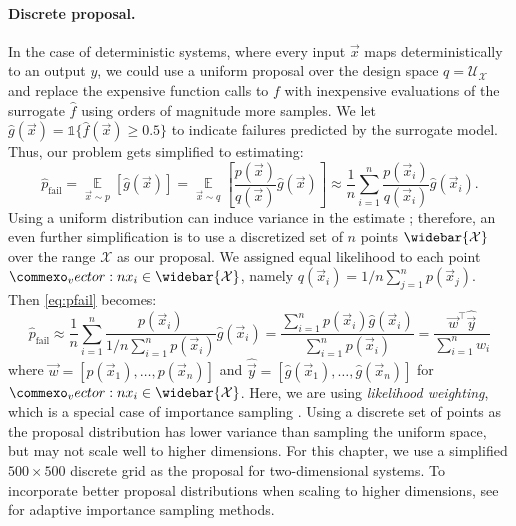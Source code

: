 \paragraph{Discrete proposal.}
In the case of deterministic systems, where every input $\vec{x}$ maps deterministically to an output $y$, we could use a uniform proposal over the design space $q = \mathcal{U}_\mathcal{X}$ and replace the expensive function calls to $f$ with inexpensive evaluations of the surrogate $\hat{f}$ using orders of magnitude more samples.
We let $\hat{g}(\vec{x}) = \mathds{1}\{\hat{f}(\vec{x}) \ge 0.5\}$ to indicate failures predicted by the surrogate model.
Thus, our problem gets simplified to estimating:
\begin{equation}
    \hat{p}_\text{fail} = \operatorname*{\mathbb{E}}_{\vec{x} \sim p}[\hat{g}(\vec{x})] = \operatorname*{\mathbb{E}}_{\vec{x} \sim q}\left[\frac{p(\vec{x})}{q(\vec{x})}\hat{g}(\vec{x})\right] \approx \frac{1}{n} \sum_{i=1}^n \frac{p(\vec{x}_i)}{q(\vec{x}_i)}\hat{g}(\vec{x}_i).\label{eq:pfail}
\end{equation}
Using a uniform distribution can induce variance in the estimate \cite{bishop2006pattern}; therefore, an even further simplification is to use a discretized set of $n$ points $\widebar{\mathcal{X}}$ over the range $\mathcal{X}$ as our proposal.
We assigned equal likelihood to each point $\vec{x}_i \in \widebar{\mathcal{X}}$, namely $q(\vec{x}_i) = 1/n\sum_{j=1}^n p(\vec{x}_j)$.
Then \cref{eq:pfail} becomes:
\begin{equation}
    \hat{p}_\text{fail} \approx \frac{1}{n} \sum_{i=1}^n \frac{p(\vec{x}_i)}{1/n\sum_{i=1}^n p(\vec{x}_i)}\hat{g}(\vec{x}_i) = \frac{\sum_{i=1}^n p(\vec{x}_i)\hat{g}(\vec{x}_i)}{\sum_{i=1}^n p(\vec{x}_i)} = \frac{\vec{w}^\top\hat{\vec{y}}}{\sum_{i=1}^n w_i}
\end{equation}
where $\vec{w} = [p(\vec{x}_1), \ldots, p(\vec{x}_n)]$ and $\hat{\vec{y}} = [\hat{g}(\vec{x}_1), \ldots, \hat{g}(\vec{x}_n)]$ for $\vec{x}_i \in \widebar{\mathcal{X}}$.
Here, we are using \textit{likelihood weighting}, which is a special case of importance sampling \cite{bishop2006pattern,murphy2012machine}.
Using a discrete set of points as the proposal distribution has lower variance than sampling the uniform space, but may not scale well to higher dimensions.
For this chapter, we use a simplified $500 \times 500$ discrete grid as the proposal for two-dimensional systems.
To incorporate better proposal distributions when scaling to higher dimensions, see \textcite{bugallo2017adaptive} for adaptive importance sampling methods.

